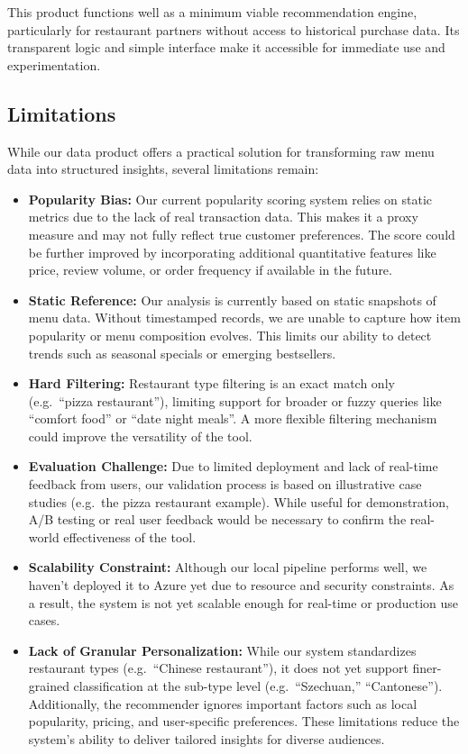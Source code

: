 \documentclass[
  11pt,
  a4paper,
  DIV=11,
  numbers=noendperiod]{scrartcl}
\providecommand{\tightlist}{%
  \setlength{\itemsep}{0pt}\setlength{\parskip}{0pt}}\usepackage{longtable,booktabs,array}
\begin{document}
This product functions well as a minimum viable recommendation engine,
particularly for restaurant partners without access to historical
purchase data. Its transparent logic and simple interface make it
accessible for immediate use and experimentation.

\subsection{Limitations}\label{limitations-1}

While our data product offers a practical solution for transforming raw
menu data into structured insights, several limitations remain:

\begin{itemize}
\tightlist
\item
  \textbf{Popularity Bias:} Our current popularity scoring system relies
  on static metrics due to the lack of real transaction data. This makes
  it a proxy measure and may not fully reflect true customer
  preferences. The score could be further improved by incorporating
  additional quantitative features like price, review volume, or order
  frequency if available in the future.
\item
  \textbf{Static Reference:} Our analysis is currently based on static
  snapshots of menu data. Without timestamped records, we are unable to
  capture how item popularity or menu composition evolves. This limits
  our ability to detect trends such as seasonal specials or emerging
  bestsellers.
\item
  \textbf{Hard Filtering:} Restaurant type filtering is an exact match
  only (e.g.~``pizza restaurant''), limiting support for broader or
  fuzzy queries like ``comfort food'' or ``date night meals''. A more
  flexible filtering mechanism could improve the versatility of the
  tool.
\item
  \textbf{Evaluation Challenge:} Due to limited deployment and lack of
  real-time feedback from users, our validation process is based on
  illustrative case studies (e.g.~the pizza restaurant example). While
  useful for demonstration, A/B testing or real user feedback would be
  necessary to confirm the real-world effectiveness of the tool.
\item
  \textbf{Scalability Constraint:} Although our local pipeline performs
  well, we haven't deployed it to Azure yet due to resource and security
  constraints. As a result, the system is not yet scalable enough for
  real-time or production use cases.
\item
  \textbf{Lack of Granular Personalization:} While our system
  standardizes restaurant types (e.g.~``Chinese restaurant''), it does
  not yet support finer-grained classification at the sub-type level
  (e.g.~``Szechuan,'' ``Cantonese''). Additionally, the recommender
  ignores important factors such as local popularity, pricing, and
  user-specific preferences. These limitations reduce the system's
  ability to deliver tailored insights for diverse audiences.
\end{itemize}
\end{document}
